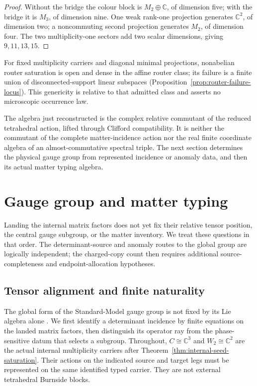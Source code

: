 \documentclass[11pt]{article}
\numberwithin{equation}{section}
\theoremstyle{definition}
\theoremstyle{remark}
\newcommand{\C}{\mathbb C}
\begin{document}
\begin{proof}
Without the bridge the colour block is $M_2\oplus\C$, of dimension five; with
the bridge it is $M_3$, of dimension nine.  One weak rank-one projection
generates $\C^2$, of dimension two; a noncommuting second projection generates
$M_2$, of dimension four.  The two multiplicity-one sectors add two scalar
dimensions, giving $9,11,13,15$.
\end{proof}

For fixed multiplicity carriers and diagonal minimal projections,
nonabelian router saturation is open and dense in the affine router class;
its failure is a finite union of disconnected-support linear subspaces
(Proposition~\ref{prop:router-failure-locus}).  This genericity is relative to
that admitted class and asserts no microscopic occurrence law.

The algebra just reconstructed is the complex relative commutant of the
reduced tetrahedral action, lifted through Clifford compatibility.  It is
neither the commutant of the complete matter-incidence action nor the real
finite coordinate algebra of an almost-commutative spectral triple.
The next section determines the physical gauge group from represented
incidence or anomaly data, and then its actual matter typing algebra.


\section{Gauge group and matter typing}
\label{sec:gauge-matter}

Landing the internal matrix factors does not yet fix their relative tensor
position, the central gauge subgroup, or the matter inventory.  We treat
these questions in that order.  The determinant-source and anomaly routes
to the global group are logically independent; the charged-copy count then
requires additional source-completeness and endpoint-allocation hypotheses.


\subsection{Tensor alignment and finite naturality}
\label{sec:determinant-naturality}

The global form of the Standard-Model gauge group is not fixed by its Lie
algebra alone \cite{Hucks1991,Tong2017}.  We first identify a determinant
incidence by finite equations on the landed matrix factors, then distinguish
its operator ray from the phase-sensitive datum that selects a subgroup.
Throughout, $C\cong\C^3$ and $W_2\cong\C^2$ are the actual internal
multiplicity carriers after Theorem~\ref{thm:internal-seed-saturation}.
Their actions on the indicated source and target legs must be represented on
the same identified typed carrier.  They are not external tetrahedral
Burnside blocks.
\end{document}
